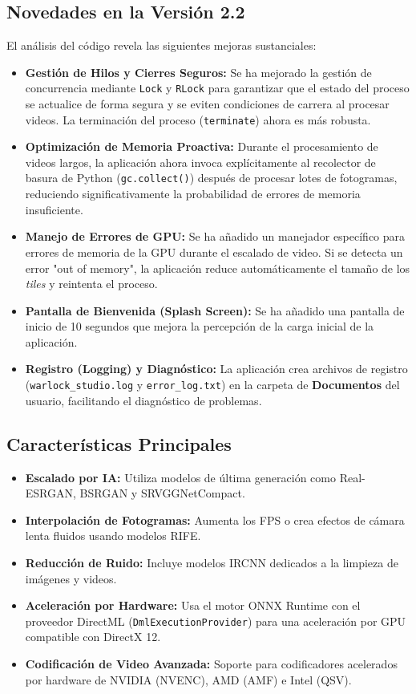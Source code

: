 \documentclass[11pt, a4paper]{article}
\begin{document}
\subsection{Novedades en la Versión 2.2}
El análisis del código revela las siguientes mejoras sustanciales:
\begin{itemize}[leftmargin=*]
    \item \textbf{Gestión de Hilos y Cierres Seguros:} Se ha mejorado la gestión de concurrencia mediante \texttt{Lock} y \texttt{RLock} para garantizar que el estado del proceso se actualice de forma segura y se eviten condiciones de carrera al procesar videos. La terminación del proceso (\texttt{terminate}) ahora es más robusta.
    \item \textbf{Optimización de Memoria Proactiva:} Durante el procesamiento de videos largos, la aplicación ahora invoca explícitamente al recolector de basura de Python (\texttt{gc.collect()}) después de procesar lotes de fotogramas, reduciendo significativamente la probabilidad de errores de memoria insuficiente.
    \item \textbf{Manejo de Errores de GPU:} Se ha añadido un manejador específico para errores de memoria de la GPU durante el escalado de video. Si se detecta un error "out of memory", la aplicación reduce automáticamente el tamaño de los \textit{tiles} y reintenta el proceso.
    \item \textbf{Pantalla de Bienvenida (Splash Screen):} Se ha añadido una pantalla de inicio de 10 segundos que mejora la percepción de la carga inicial de la aplicación.
    \item \textbf{Registro (Logging) y Diagnóstico:} La aplicación crea archivos de registro (\texttt{warlock\_studio.log} y \texttt{error\_log.txt}) en la carpeta de \textbf{Documentos} del usuario, facilitando el diagnóstico de problemas.
\end{itemize}

\subsection{Características Principales}
\begin{itemize}[leftmargin=*]
    \item \textbf{Escalado por IA:} Utiliza modelos de última generación como Real-ESRGAN, BSRGAN y SRVGGNetCompact.
    \item \textbf{Interpolación de Fotogramas:} Aumenta los FPS o crea efectos de cámara lenta fluidos usando modelos RIFE.
    \item \textbf{Reducción de Ruido:} Incluye modelos IRCNN dedicados a la limpieza de imágenes y videos.
    \item \textbf{Aceleración por Hardware:} Usa el motor ONNX Runtime con el proveedor DirectML (\texttt{DmlExecutionProvider}) para una aceleración por GPU compatible con DirectX 12.
    \item \textbf{Codificación de Video Avanzada:} Soporte para codificadores acelerados por hardware de NVIDIA (NVENC), AMD (AMF) e Intel (QSV).
\end{itemize}
\end{document}
